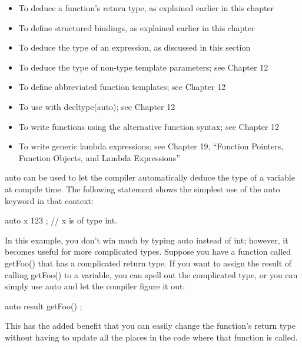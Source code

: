 \begin{itemize}
\item
To deduce a function’s return type, as explained earlier in this chapter

\item
To define structured bindings, as explained earlier in this chapter

\item
To deduce the type of an expression, as discussed in this section

\item
To deduce the type of non-type template parameters; see Chapter 12

\item
To define abbreviated function templates; see Chapter 12

\item
To use with decltype(auto); see Chapter 12

\item
To write functions using the alternative function syntax; see Chapter 12

\item
To write generic lambda expressions; see Chapter 19, “Function Pointers, Function Objects, and Lambda Expressions”
\end{itemize}

auto can be used to let the compiler automatically deduce the type of a variable at compile time. The following statement shows the simplest use of the auto keyword in that context:

\begin{cpp}
auto x { 123 }; // x is of type int.
\end{cpp}

In this example, you don’t win much by typing auto instead of int; however, it becomes useful for more complicated types. Suppose you have a function called getFoo() that has a complicated return type. If you want to assign the result of calling getFoo() to a variable, you can spell out the complicated type, or you can simply use auto and let the compiler figure it out:

\begin{cpp}
auto result { getFoo() };
\end{cpp}

This has the added benefit that you can easily change the function’s return type without having to update all the places in the code where that function is called.


